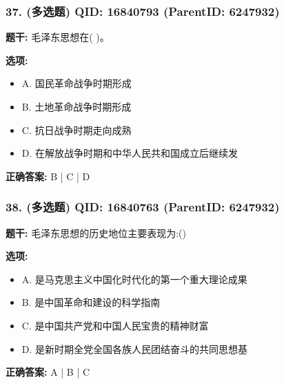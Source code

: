 \documentclass[12pt,UTF8]{ctexart}
\begin{document}
\subsubsection*{37. (多选题) \small QID: 16840793 (ParentID: 6247932)}

\textbf{题干:}
毛泽东思想在( )。



\textbf{选项:}
\begin{itemize}[leftmargin=*]

  \item A. 国民革命战争时期形成

  \item B. 土地革命战争时期形成

  \item C. 抗日战争时期走向成熟

  \item D. 在解放战争时期和中华人民共和国成立后继续发

\end{itemize}

\textbf{正确答案:}
B | C | D

\vspace{0.3em}\hrulefill\vspace{0.7em}

\subsubsection*{38. (多选题) \small QID: 16840763 (ParentID: 6247932)}

\textbf{题干:}
毛泽东思想的历史地位主要表现为:()



\textbf{选项:}
\begin{itemize}[leftmargin=*]

  \item A. 是马克思主义中国化时代化的第一个重大理论成果

  \item B. 是中国革命和建设的科学指南

  \item C. 是中国共产党和中国人民宝贵的精神财富

  \item D. 是新时期全党全国各族人民团结奋斗的共同思想基

\end{itemize}

\textbf{正确答案:}
A | B | C

\vspace{0.3em}\hrulefill\vspace{0.7em}
\end{document}
